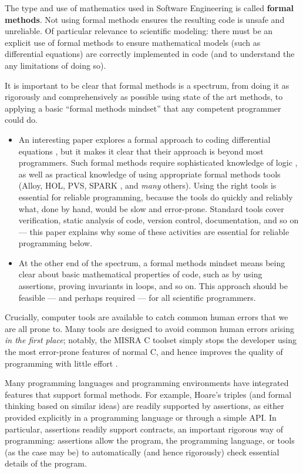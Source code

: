\documentclass[10pt,a4paper]{article}
\begin{document}
{The type and use of mathematics used in Software Engineering is called \textbf{formal methods}. Not using formal methods ensures the resulting code is unsafe and unreliable. Of particular relevance to scientific modeling: there must be an explicit use of formal methods to ensure mathematical models (such as differential equations) are correctly implemented in code (and to understand the any limitations of doing so).}

It is important to be clear that formal methods is a spectrum, from doing it as rigorously and comprehensively as possible using state of the art methods, to applying a basic ``formal methods mindset'' that any competent programmer could do.

\begin{itemize}\raggedright\item An interesting paper explores a formal approach to coding differential equations \cite{differential-equations}, but it makes it clear that their approach is beyond most programmers. Such formal methods require sophisticated knowledge of logic \cite{cbc}, as well as practical knowledge of using appropriate formal methods tools (Alloy, HOL, PVS, SPARK \cite{spark}, and \emph{many\/} others). Using the right tools is essential for reliable programming, because the tools do quickly and reliably what, done by hand, would be slow and error-prone. Standard tools cover verification, static analysis of code, version control, documentation, and so on --- this paper explains why some of these activities are essential for reliable programming below. 

\item At the other end of the spectrum, a formal methods mindset means being clear about basic mathematical properties of code, such as by using assertions, proving invariants in loops, and so on. This approach should be feasible --- and perhaps required --- for all scientific programmers.
\end{itemize}

Crucially, computer tools are available to catch common human errors that we are all prone to. Many tools are designed to avoid common human errors arising \emph{in the first place\/}; notably, the MISRA C toolset simply stops the developer using the most error-prone features of normal C, and hence improves the quality of programming with little effort \cite{misra}.

Many programming languages and programming environments have integrated features that support formal methods. For example, Hoare's triples \cite{hoare} (and formal thinking based on similar ideas) are readily supported by assertions, as either provided explicitly in a programming language or through a simple API\@. In particular, assertions readily support contracts, an important rigorous way of programming: assertions allow the program, the programming language, or tools (as the case may be) to automatically (and hence rigorously) check essential details of the program. 
\end{document}

